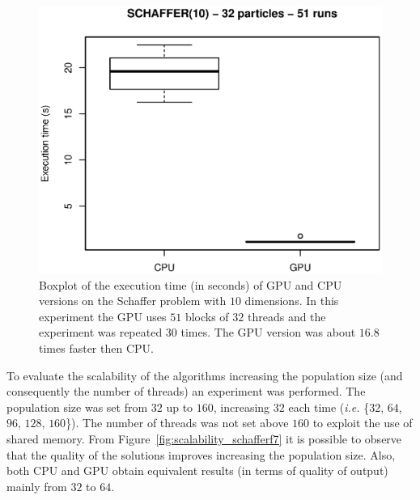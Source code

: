 \documentclass[conference]{IEEEtran}
\begin{document}
    
    \begin{figure}[!htb]
        \centering
        \includegraphics[width=\columnwidth]{../img/schaffer10_32particles_time.eps}
        \caption{Boxplot of the execution time (in seconds) of GPU and CPU versions on the Schaffer problem with $10$ dimensions. In this experiment the GPU uses $51$ blocks of $32$ threads and the experiment was repeated $30$ times. The GPU version was about $16.8$ times faster then CPU.}
        \label{fig:schaffer10_32particles_time}
    \end{figure}

    To evaluate the scalability of the algorithms increasing the population size (and consequently the number of threads) an experiment was performed.
    The population size was set from $32$ up to $160$, increasing $32$ each time ({\it i.e.} \{$32$, $64$, $96$, $128$, $160$\}). The number of threads was not set above $160$ to exploit the use of shared memory. From Figure~\ref{fig:scalability_schafferf7} it is possible to observe that the quality of the solutions improves increasing the population size. Also, both CPU and GPU obtain equivalent results (in terms of quality of output) mainly from $32$ to $64$.
\end{document}
